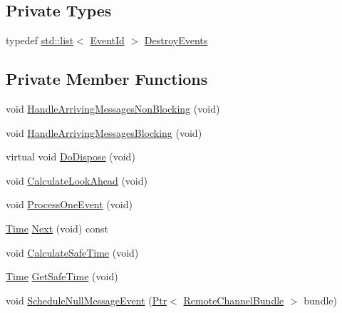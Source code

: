 \subsection*{Private Types}
\begin{DoxyCompactItemize}
\item 
typedef \hyperlink{openflow-interface_8h_afd9bcfa176617760671b67580f536fa7}{std\+::list}$<$ \hyperlink{classns3_1_1EventId}{Event\+Id} $>$ \hyperlink{classns3_1_1NullMessageSimulatorImpl_ab649c69a3c50995571fbf4f9c501fd9c}{Destroy\+Events}
\end{DoxyCompactItemize}
\subsection*{Private Member Functions}
\begin{DoxyCompactItemize}
\item 
void \hyperlink{classns3_1_1NullMessageSimulatorImpl_a8657269a848359b005c99e1793a6d746}{Handle\+Arriving\+Messages\+Non\+Blocking} (void)
\item 
void \hyperlink{classns3_1_1NullMessageSimulatorImpl_ad5c131aba980fb0e6cba16d7feab9fb5}{Handle\+Arriving\+Messages\+Blocking} (void)
\item 
virtual void \hyperlink{classns3_1_1NullMessageSimulatorImpl_aac81ae1693fc790b605e364310906e38}{Do\+Dispose} (void)
\item 
void \hyperlink{classns3_1_1NullMessageSimulatorImpl_af0601d38e69b1e21d89c7cfdc59896c8}{Calculate\+Look\+Ahead} (void)
\item 
void \hyperlink{classns3_1_1NullMessageSimulatorImpl_a409f15407fc49b56819097c108bbb50e}{Process\+One\+Event} (void)
\item 
\hyperlink{classns3_1_1Time}{Time} \hyperlink{classns3_1_1NullMessageSimulatorImpl_ad1e39ec20b291ecad898338eab074d0b}{Next} (void) const 
\item 
void \hyperlink{classns3_1_1NullMessageSimulatorImpl_a50deae67a34fb3c9868973aa2d40cc12}{Calculate\+Safe\+Time} (void)
\item 
\hyperlink{classns3_1_1Time}{Time} \hyperlink{classns3_1_1NullMessageSimulatorImpl_ac3ac75383c83e269b9258bdb9de097c0}{Get\+Safe\+Time} (void)
\item 
void \hyperlink{classns3_1_1NullMessageSimulatorImpl_af281eadb697cd73293300c30b6bd975d}{Schedule\+Null\+Message\+Event} (\hyperlink{classns3_1_1Ptr}{Ptr}$<$ \hyperlink{classns3_1_1RemoteChannelBundle}{Remote\+Channel\+Bundle} $>$ bundle)
\item 

\end{DoxyCompactItemize}
